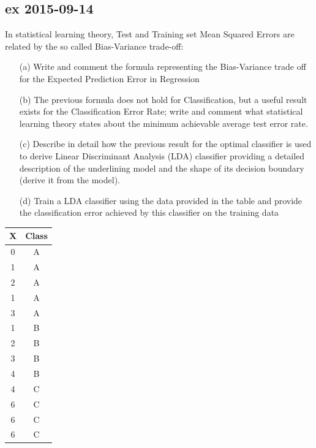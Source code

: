 \documentclass[a4paper,12pt,titlepage]{article} %
\begin{document}
\subsection{ex 2015-09-14}
In statistical learning theory, Test and Training set Mean Squared Errors are related by the so called Bias-Variance trade-off:
\begin{itemize}
\item[(a)] Write and comment the formula representing the Bias-Variance trade off for the Expected Prediction Error in Regression
\item[(b)] The previous formula does not hold for Classification, but a useful result exists for the Classification Error Rate; write and comment what statistical learning theory states about the minimum achievable average test error rate.
\item[(c)] Describe in detail how the previous result for the optimal classifier is used to derive Linear Discriminant Analysis (LDA) classifier providing a detailed description of the underlining model and the shape of its decision boundary (derive it from the model).
\item[(d)] Train a LDA classifier using the data provided in the table and provide the classification error achieved by this classifier on the training data
\end{itemize}

\begin{center}
  \begin{tabular}{c|c}
    X & Class \\
    \hline
    \hline
    0 & A \\
    1 & A \\
    2 & A \\
    1 & A \\
    3 & A \\
    \hline
    1 & B \\
    2 & B \\
    3 & B \\
    4 & B \\
    \hline
    4 & C \\
    6 & C \\
    6 & C \\
    6 & C \\
    \hline
  \end{tabular}
\end{center}
\end{document}
